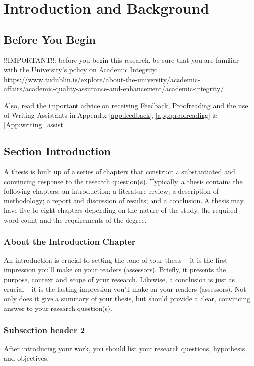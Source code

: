 
\chapter{Introduction and Background} \label{sec:introduction}

\section{Before You Begin}
!!IMPORTANT!!: before you begin this research, be sure that you are familiar with the University's policy on Academic Integrity: \url{https://www.tudublin.ie/explore/about-the-university/academic-affairs/academic-quality-assurance-and-enhancement/academic-integrity/}

Also, read the important advice on receiving Feedback, Proofreading and the use
of Writing Assistants in Appendix \ref{app:feedback}, \ref{app:proofreading} \&
\ref{App:writing_assist}.

\section{Section Introduction}
A thesis is built up of a series of chapters that construct a substantiated and
convincing response to the research question(s). Typically, a thesis contains
the following chapters: an introduction; a literature review; a description of
methodology; a report and discussion of results; and a conclusion. A thesis may
have five to eight chapters depending on the nature of the study, the required
word count and the requirements of the degree.

\subsection{About the Introduction Chapter}
An introduction is crucial to setting the tone of your thesis – it is the first
impression you’ll make on your readers (assessors). Briefly, it presents the
purpose, context and scope of your research. Likewise, a conclusion is just as
crucial – it is the lasting impression you’ll make on your readers (assessors).
Not only does it give a summary of your thesis, but should provide a clear,
convincing answer to your research question(s).
\subsection{Subsection header 2}
After introducing your work, you should list your research questions,
hypothesis, and objectives.

